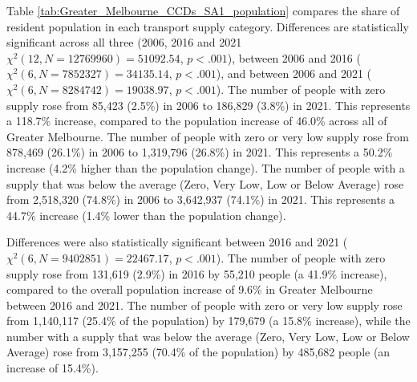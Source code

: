 \documentclass[preprint, 3p,
authoryear]{elsarticle} %
\begin{document}
Table \ref{tab:Greater_Melbourne_CCDs_SA1_population} compares the share
of resident population in each transport supply category. Differences
are statistically significant across all three (2006, 2016 and 2021
\(\chi^2(12, N = 12769960) = 51092.54\), \(p < .001\)), between 2006 and
2016 (\(\chi^2(6, N = 7852327) = 34135.14\), \(p < .001\)), and between
2006 and 2021 (\(\chi^2(6, N = 8284742) = 19038.97\), \(p < .001\)). The
number of people with zero supply rose from 85,423 (2.5\%) in 2006 to
186,829 (3.8\%) in 2021. This represents a 118.7\% increase, compared to
the population increase of 46.0\% across all of Greater Melbourne. The
number of people with zero or very low supply rose from 878,469 (26.1\%)
in 2006 to 1,319,796 (26.8\%) in 2021. This represents a 50.2\% increase
(4.2\% higher than the population change). The number of people with a
supply that was below the average (Zero, Very Low, Low or Below Average)
rose from 2,518,320 (74.8\%) in 2006 to 3,642,937 (74.1\%) in 2021. This
represents a 44.7\% increase (1.4\% lower than the population change).

Differences were also statistically significant between 2016 and 2021
(\(\chi^2(6, N = 9402851) = 22467.17\), \(p < .001\)). The number of
people with zero supply rose from 131,619 (2.9\%) in 2016 by 55,210
people (a 41.9\% increase), compared to the overall population increase
of 9.6\% in Greater Melbourne between 2016 and 2021. The number of
people with zero or very low supply rose from 1,140,117 (25.4\% of the
population) by 179,679 (a 15.8\% increase), while the number with a
supply that was below the average (Zero, Very Low, Low or Below Average)
rose from 3,157,255 (70.4\% of the population) by 485,682 people (an
increase of 15.4\%).

\begingroup\fontsize{8}{10}\selectfont
\end{document}

